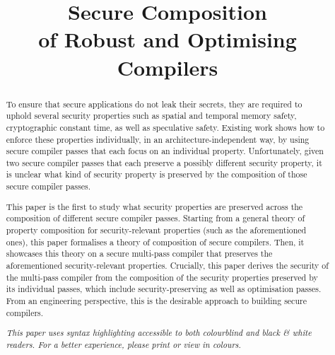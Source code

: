 \documentclass[dvipsnames,conference]{IEEEtran}
\theoremstyle{definition}
\begin{document}
\linenumbers

\title{
  Secure Composition 
  \\ 
  of Robust and Optimising Compilers
}


\maketitle

\begin{abstract}
To ensure that secure applications do not leak their secrets, they are required to uphold several security properties such as spatial and temporal memory safety, cryptographic constant time, as well as speculative safety.
Existing work shows how to enforce these properties individually, in an architecture-independent way, by using secure compiler passes that each focus on an individual property.
Unfortunately, given two secure compiler passes that each preserve a possibly different security property, it is unclear what kind of security property is preserved by the composition of those secure compiler passes.

This paper is the first to study what security properties are preserved across the composition of different secure compiler passes.
Starting from a general theory of property composition for security-relevant properties (such as the aforementioned ones), this paper formalises a theory of composition of secure compilers.
Then, it showcases this theory on a secure multi-pass compiler that preserves the aforementioned security-relevant properties.
Crucially, this paper derives the security of the multi-pass compiler from the composition of the security properties preserved by its individual passes, which include security-preserving as well as optimisation passes.
% 
From an engineering perspective, this is the desirable approach to building secure compilers.
\begin{center}\small\it
	{This paper uses syntax highlighting accessible to both colourblind and black \& white readers.
	For a better experience, please print or view in colours.
	}
\end{center}
\end{abstract}
\end{document}
